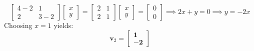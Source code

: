 \begin{enumerate}
\begin{equation*}
    \begin{bmatrix} 4 - 2 & 1 \\ 2 & 3 - 2 \end{bmatrix} \begin{bmatrix} x \\ y \end{bmatrix} = \begin{bmatrix} 2 & 1 \\ 2 & 1 \end{bmatrix} \begin{bmatrix} x \\ y \end{bmatrix} = \begin{bmatrix} 0 \\ 0 \end{bmatrix} \implies 2x + y = 0 \implies y = -2x
    \end{equation*}
    Choosing $x = 1$ yields:
    \begin{equation*}
    \mathbf{v}_2 = \mathbf{\begin{bmatrix} 1 \\ -2 \end{bmatrix}}
    \end{equation*}
\end{enumerate}

